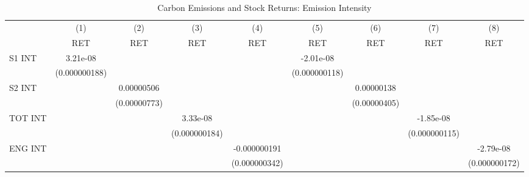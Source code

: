 \begin{table}[htbp]\centering
\def\sym#1{\ifmmode^{#1}\else\(^{#1}\)\fi}
\caption{Carbon Emissions and Stock Returns: Emission Intensity}
\begin{tabular}{l*{8}{c}}
\hline\hline
                    &\multicolumn{1}{c}{(1)}&\multicolumn{1}{c}{(2)}&\multicolumn{1}{c}{(3)}&\multicolumn{1}{c}{(4)}&\multicolumn{1}{c}{(5)}&\multicolumn{1}{c}{(6)}&\multicolumn{1}{c}{(7)}&\multicolumn{1}{c}{(8)}\\
                    &\multicolumn{1}{c}{RET}&\multicolumn{1}{c}{RET}&\multicolumn{1}{c}{RET}&\multicolumn{1}{c}{RET}&\multicolumn{1}{c}{RET}&\multicolumn{1}{c}{RET}&\multicolumn{1}{c}{RET}&\multicolumn{1}{c}{RET}\\
\hline
S1 INT              &    3.21e-08         &                     &                     &                     &   -2.01e-08         &                     &                     &                     \\
                    &(0.000000188)         &                     &                     &                     &(0.000000118)         &                     &                     &                     \\
S2 INT              &                     &  0.00000506         &                     &                     &                     &  0.00000138         &                     &                     \\
                    &                     &(0.00000773)         &                     &                     &                     &(0.00000405)         &                     &                     \\
TOT INT             &                     &                     &    3.33e-08         &                     &                     &                     &   -1.85e-08         &                     \\
                    &                     &                     &(0.000000184)         &                     &                     &                     &(0.000000115)         &                     \\
ENG INT             &                     &                     &                     &-0.000000191         &                     &                     &                     &   -2.79e-08         \\
                    &                     &                     &                     &(0.000000342)         &                     &                     &                     &(0.000000172)         \\

\end{tabular}
\end{table}
